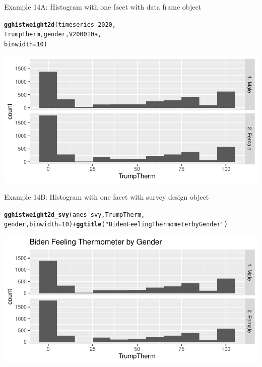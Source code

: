\documentclass{beamer}\usepackage[]{graphicx}\usepackage[]{xcolor}
\makeatletter
\newcommand{\hlnum}[1]{\textcolor[rgb]{0.686,0.059,0.569}{#1}}%
\newcommand{\hlstr}[1]{\textcolor[rgb]{0.192,0.494,0.8}{#1}}%
\newcommand{\hlopt}[1]{\textcolor[rgb]{0,0,0}{#1}}%
\newcommand{\hlstd}[1]{\textcolor[rgb]{0.345,0.345,0.345}{#1}}%
\newcommand{\hlkwc}[1]{\textcolor[rgb]{0.333,0.667,0.333}{#1}}%
\newcommand{\hlkwd}[1]{\textcolor[rgb]{0.737,0.353,0.396}{\textbf{#1}}}%
\newenvironment{kframe}{%
 \def\at@end@of@kframe{}%
 \ifinner\ifhmode%
  \def\at@end@of@kframe{\end{minipage}}%
  \begin{minipage}{\columnwidth}%
 \fi\fi%
 \def\FrameCommand##1{\hskip\@totalleftmargin \hskip-\fboxsep
 \colorbox{shadecolor}{##1}\hskip-\fboxsep
     \hskip-\linewidth \hskip-\@totalleftmargin \hskip\columnwidth}%
 \MakeFramed {\advance\hsize-\width
   \@totalleftmargin\z@ \linewidth\hsize
   \@setminipage}}%
 {\par\unskip\endMakeFramed%
 \at@end@of@kframe}
\newenvironment{knitrout}{}{} %
\makeatother
\begin{document}
\begin{frame}[fragile]{Example 14A: Histogram with one facet with data frame object}
\begin{knitrout}
\color{fgcolor}\begin{kframe}
\begin{alltt}
\hlkwd{gghistweight2d}\hlstd{(timeseries_2020,}
    \hlstd{TrumpTherm, gender, V200010a,}
    \hlkwc{binwidth} \hlstd{=} \hlnum{10}\hlstd{)}
\end{alltt}
\end{kframe}
\includegraphics[width=0.95\linewidth]{figure/unnamed-chunk-75-1} 
\end{knitrout}
\end{frame}

\begin{frame}[fragile]{Example 14B: Histogram with one facet with survey design object}
\begin{knitrout}
\color{fgcolor}\begin{kframe}
\begin{alltt}
\hlkwd{gghistweight2d_svy}\hlstd{(anes_svy, TrumpTherm,}
    \hlstd{gender,} \hlkwc{binwidth} \hlstd{=} \hlnum{10}\hlstd{)} \hlopt{+} \hlkwd{ggtitle}\hlstd{(}\hlstr{"Biden Feeling Thermometer by Gender"}\hlstd{)}
\end{alltt}
\end{kframe}
\includegraphics[width=0.95\linewidth]{figure/unnamed-chunk-76-1} 
\end{knitrout}

\end{frame}
\end{document}
